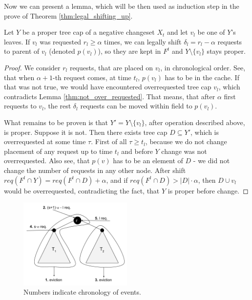 Now we can present a lemma, which will be then used as induction step in the 
prove of Theorem \ref{thm:legal_shifting_up}.
\begin{lemma}
Let $Y$ be a proper tree cap of a negative changeset $X_t$ and let $v_l$ be one 
of $Y$'s leaves. If $v_l$ was requested $r_l \geq \alpha$ times, we can legally 
shift  $\delta_l = r_l - \alpha$ requests to parent of $v_l$ (denoted $p(v_l)$),
 so they are kept in $F^t$ and $Y \setminus \{v_l\}$ stays proper. 
\end{lemma}
\begin{proof}
We consider $r_l$ requests, that are placed on $v_l$, in chronological order. 
See, that when $\alpha + 1$-th request comes, at time $t_l$, $p(v_l)$ has to be
 in the cache. If that was not true, we would have encountered overrequested 
tree cap ${v_l}$, which contradicts Lemma \ref{thm:not_over_requested}. That 
means, that after $\alpha$ first requests to $v_l$, the rest $\delta_l$ requests
 can be moved within field to $p(v_l)$.

What remains to be proven is that $Y' = Y \setminus \{v_l\}$, after operation 
described above, is proper. Suppose it is not. Then there exists tree cap 
$D \subseteq Y'$, which is overrequested at some time $\tau$. First of all 
$\tau \geq t_l$, because we do not change placement of any request up to time 
$t_l$ and before $Y$ change was not overrequested. Also see, that $p(v)$ has to 
be an element of $D$ - we did not change the number of requests in any other 
node. After shift $req(F^t \cap Y) = req(F^t \cap D) + \alpha$, and if 
$req(F^t \cap D) > |D| \cdot \alpha$, then $D \cup v_l$ would be overrequested, 
contradicting the fact, that $Y$ is proper before change.
\end{proof}
\begin{figure}
\vspace{-20pt}
 \begin{center}
  \includegraphics[width=0.5\textwidth]{example_not_even.png}
\end{center}
\caption{Numbers indicate chronology of events.}
\vspace{-20pt}
\label{fig:example_not_even}
\end{figure}

